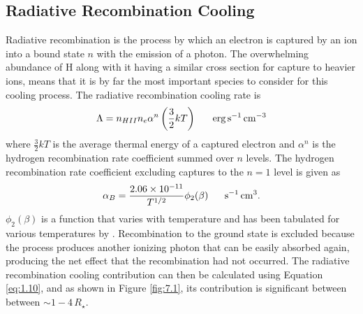 \subsection{Radiative Recombination Cooling}\label{sec:7.3.2}
Radiative recombination is the process by which an electron is captured by an ion into a bound state $n$ with the emission of a photon. The overwhelming abundance of H along with it having a similar cross section for capture to heavier ions, means that it is by far the most important species to consider for this cooling process. The radiative recombination cooling rate is 
\begin{equation}
\Lambda = n_{HII}n_e  \alpha ^{n}\left(\frac{3}{2}kT\right) \ \ \ \ \ \rm{erg\,s^{-1}\,cm^{-3}}
\end{equation}
where $\frac{3}{2}kT$ is the average thermal energy of a captured electron and $\alpha ^{n}$ is the hydrogen recombination rate coefficient summed over $n$ levels. The hydrogen recombination rate coefficient excluding captures to the $n=1$ level is given as 
\begin{equation}
\alpha _{B}= \frac{2.06\times 10^{-11}}{T^{1/2}}\phi _{2}(\beta) \ \ \ \ \ \rm{s^{-1}\,cm^{3}}.
\end{equation}
$\phi _{2}(\beta)$ is a function that varies with temperature and has been tabulated for various temperatures by \citep{spitzer_1978}. Recombination to the ground state is excluded because the process produces another ionizing
photon that can be easily absorbed again, producing the net effect that the recombination had not occurred. The radiative recombination cooling contribution can then be calculated using Equation \ref{eq:1.10}, and as shown in Figure \ref{fig:7.1}, its contribution is significant between between $\sim 1-4\,R_{\star}$. 

